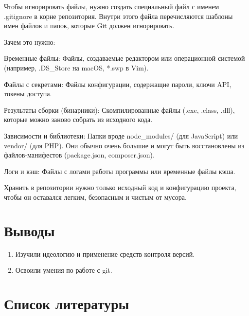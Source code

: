 \documentclass[
  english,
  russian,
  12pt,
  a4paper,
  DIV=11,
  numbers=noendperiod]{scrreprt}
\providecommand{\tightlist}{%
  \setlength{\itemsep}{0pt}\setlength{\parskip}{0pt}}
\begin{document}
Чтобы игнорировать файлы, нужно создать специальный файл с именем
.gitignore в корне репозитория. Внутри этого файла перечисляются шаблоны
имен файлов и папок, которые Git должен игнорировать.

Зачем это нужно:

Временные файлы: Файлы, создаваемые редактором или операционной системой
(например, .DS\_Store на macOS, *.swp в Vim).

Файлы с секретами: Файлы конфигурации, содержащие пароли, ключи API,
токены доступа.

Результаты сборки (бинарники): Скомпилированные файлы (.exe, .class,
.dll), которые можно заново собрать из исходного кода.

Зависимости и библиотеки: Папки вроде node\_modules/ (для JavaScript)
или vendor/ (для PHP). Они обычно очень большие и могут быть
восстановлены из файлов-манифестов (package.json, composer.json).

Логи и кэш: Файлы с логами работы программы или временные файлы кэша.

Хранить в репозитории нужно только исходный код и конфигурацию проекта,
чтобы он оставался легким, безопасным и чистым от мусора.

\chapter{Выводы}\label{ux432ux44bux432ux43eux434ux44b}

\begin{enumerate}
\def\labelenumi{\arabic{enumi})}
\tightlist
\item
  Изучили идеологию и применение средств контроля версий.
\item
  Освоили умения по работе с git.
\end{enumerate}

\chapter*{Список
литературы}\label{ux441ux43fux438ux441ux43eux43a-ux43bux438ux442ux435ux440ux430ux442ux443ux440ux44b}

\printbibliography[heading=none]
\end{document}
